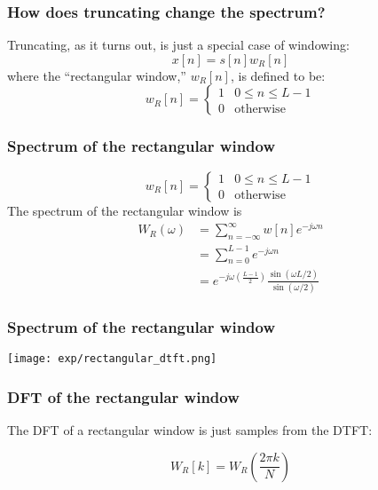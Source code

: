 \documentclass{beamer}
\begin{document}
\begin{frame}
  \frametitle{How does truncating change the spectrum?}

  Truncating, as it turns out, is just a special case of windowing:
  \begin{displaymath}
    x[n] =s[n]w_R[n]
  \end{displaymath}
  where the ``rectangular window,'' $w_R[n]$, is defined to be:
  \begin{displaymath}
    w_R[n]=\begin{cases}1&0\le n\le L-1\\
    0 &\mbox{otherwise}\end{cases}
  \end{displaymath}
\end{frame}

\begin{frame}
  \frametitle{Spectrum of the rectangular window}

  \begin{displaymath}
    w_R[n]=\begin{cases}1&0\le n\le L-1\\
    0 &\mbox{otherwise}\end{cases}
  \end{displaymath}
  The spectrum of the rectangular window is
  \begin{align*}
    W_R(\omega) &= \sum_{n=-\infty}^\infty  w[n]e^{-j\omega n}\\
    &= \sum_{n=0}^{L-1} e^{-j\omega n}\\
    &= e^{-j\omega\left(\frac{L-1}{2}\right)}\frac{\sin(\omega L/2)}{\sin(\omega/2)}
  \end{align*}
\end{frame}

\begin{frame}
  \frametitle{Spectrum of the rectangular window}

  \centerline{\texttt{[image: exp/rectangular\_dtft.png]}}
\end{frame}

\begin{frame}
  \frametitle{DFT of the rectangular window}

  The DFT of a rectangular window is just samples from the DTFT:

  \begin{displaymath}
    W_R[k] = W_R\left(\frac{2\pi k}{N}\right)
  \end{displaymath}
\end{frame}
\end{document}
